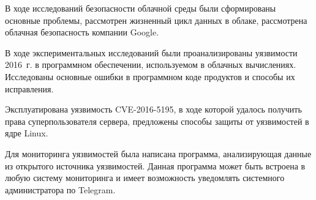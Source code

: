 В ходе исследований безопасности облачной среды были сформированы основные проблемы, рассмотрен жизненный цикл данных в облаке, рассмотрена облачная безопасность компании Google.

В ходе экспериментальных исследований были проанализированы уязвимости 2016~г. в программном обеспечении, используемом в облачных вычислениях.
Исследованы основные ошибки в программном коде продуктов и способы их исправления.

Эксплуатирована уязвимость CVE-2016-5195, в ходе которой удалось получить права суперпользователя сервера, предложены способы защиты от уязвимостей в ядре Linux.

Для мониторинга уязвимостей была написана программа, анализирующая данные из открытого источника уязвимостей.
Данная программа может быть встроена в любую систему мониторинга и имеет возможность уведомлять системного администратора по Telegram.

\clearpage
